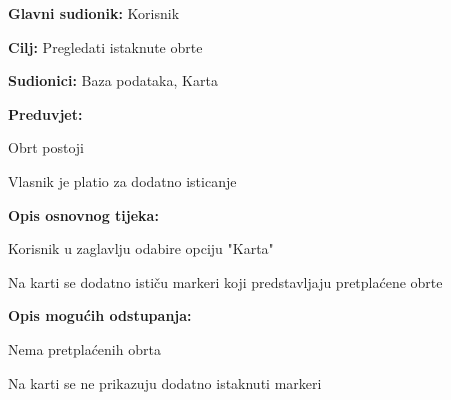                 \noindent {}
					\begin{packed_item}
	
						\item \textbf{Glavni sudionik: } Korisnik
						\item  \textbf{Cilj:} Pregledati istaknute obrte
						\item  \textbf{Sudionici:} Baza podataka, Karta
						\item  \textbf{Preduvjet:} 
						\item[--] Obrt postoji
						\item[--] Vlasnik je platio za dodatno isticanje
						\item  \textbf{Opis osnovnog tijeka:}
						
						\item[] \begin{packed_enum}
	
							\item Korisnik u zaglavlju odabire opciju "Karta"
							\item Na karti se dodatno ističu markeri koji predstavljaju pretplaćene obrte
							
						\end{packed_enum}
						
						\item  \textbf{Opis mogućih odstupanja:}
						
						\item[] \begin{packed_item}
	
							\item[2.a] Nema pretplaćenih obrta
							\item[] \begin{packed_enum}
								
								\item Na karti se ne prikazuju dodatno istaknuti markeri
								
							\end{packed_enum}
						\end{packed_item}
					\end{packed_item}
             
